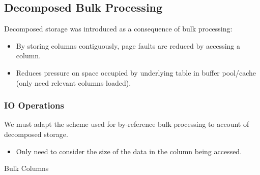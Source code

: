 \subsection{Decomposed Bulk Processing}
Decomposed storage was introduced as a consequence of bulk processing:
\begin{itemize}
  \item By storing columns contiguously, page faults are reduced by accessing a column.
  \item Reduces pressure on space occupied by underlying table in buffer pool/cache (only need relevant columns loaded).
\end{itemize}

\subsubsection{IO Operations}
We must adapt the scheme used for by-reference bulk processing to account of decomposed storage.
\begin{itemize}
  \item Only need to consider the size of the data in the column being accessed.
\end{itemize}
\begin{examplebox}{Bulk Columns}
  \unfinished
\end{examplebox}

